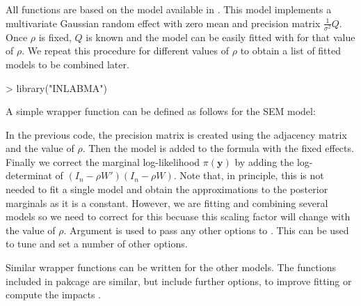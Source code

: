\documentclass[article]{jss}
\begin{document}
All functions are based on the  model available in  .
This model implements a multivariate Gaussian random effect with zero mean
and precision matrix $\frac{1}{\sigma^2} Q$. Once $\rho$ is fixed, $Q$ is
known and the model can be easily fitted with  for that value of
$\rho$. We repeat this procedure for different values of $\rho$ to
obtain a list of fitted models to be combined later.

\begin{Schunk}
\begin{Sinput}
> library("INLABMA")
\end{Sinput}
\end{Schunk}

A simple wrapper function can be defined as follows for the SEM model:

\begin{Schunk}
\end{Schunk}

In the previous code, the precision matrix is created using the adjacency
matrix and the value of $\rho$. Then the  model is added to the
formula with the fixed effects. Finally we correct the marginal log-likelihood
$\pi(\mathbf{y})$ by adding the log-determinat of $(I_n-\rho W')(I_n-\rho W)$.
Note that, in principle, this is not needed to fit a single model and obtain
the approximations to the posterior marginals as it is a constant. However, we
are fitting and combining several models so we need to correct for this
becuase this scaling factor will change with the value of $\rho$.
Argument  is used to pass any other options to . 
This can be used to tune and set a number of other options.

Similar wrapper functions can be written for the other models. The functions
included in pakcage  are similar, but include further options,
to improve fitting or compute the impacts 
\citep[see,][for details]{Bivandetal:2013}.
\end{document}
